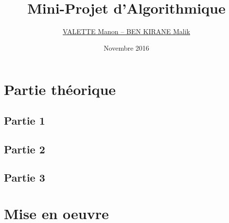 \documentclass[a4paper,11pt]{article}
\title{Mini-Projet d'Algorithmique}
\author{
  \href{mailto:malikcpp@gmail.com,valette-manon@numericable.fr}{
    VALETTE Manon
    --
    BEN KIRANE Malik 
  }
}
\date{Novembre 2016}
\newcommand\csection[1]{{\centering\section{#1}\par}}
\begin{document}
\maketitle
\tableofcontents
\csection{Partie th\'eorique}
\subsection{Partie 1}

\newpage
\subsection{Partie 2}

\newpage
\subsection{Partie 3}

\newpage
\csection{Mise en oeuvre}

\end{document}

